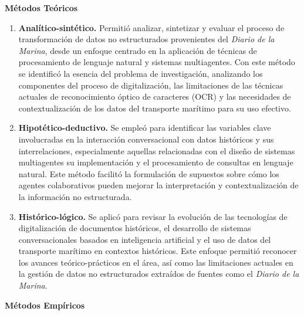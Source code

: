 \textbf{Métodos Teóricos}

\begin{enumerate}
	\item \textbf{Analítico-sintético.} Permitió analizar, sintetizar y evaluar el proceso de transformación de datos no estructurados provenientes del \textit{Diario de la Marina}, desde un enfoque centrado en la aplicación de técnicas de procesamiento de lenguaje natural y sistemas multiagentes. Con este método se identificó la esencia del problema de investigación, analizando los componentes del proceso de digitalización, las limitaciones de las técnicas actuales de reconocimiento óptico de caracteres (OCR) y las necesidades de contextualización de los datos del transporte marítimo para su uso efectivo.
	
	\item \textbf{Hipotético-deductivo.} Se empleó para identificar las variables clave involucradas en la interacción conversacional con datos históricos y sus interrelaciones, especialmente aquellas relacionadas con el diseño de sistemas multiagentes su implementación y el procesamiento de consultas en lenguaje natural. Este método facilitó la formulación de supuestos sobre cómo los agentes colaborativos pueden mejorar la interpretación y contextualización de la información no estructurada.
	
	\item \textbf{Histórico-lógico.} Se aplicó para revisar la evolución de las tecnologías de digitalización de documentos históricos, el desarrollo de sistemas conversacionales basados en inteligencia artificial y el uso de datos del transporte marítimo en contextos históricos. Este enfoque permitió reconocer los avances teórico-prácticos en el área, así como las limitaciones actuales en la gestión de datos no estructurados extraídos de fuentes como el \textit{Diario de la Marina}.
\end{enumerate}

\textbf{Métodos Empíricos}

